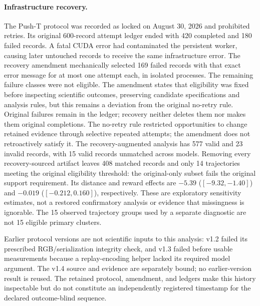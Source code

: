 \documentclass{article}
\begin{document}
\paragraph{Infrastructure recovery.}
The Push-T protocol was recorded as locked on August 30, 2026 and prohibited
retries. Its original 600-record attempt ledger ended with 420 completed and
180 failed records. A fatal CUDA error had contaminated the persistent worker,
causing later untouched records to receive the same infrastructure error.
The recovery amendment mechanically selected 169 failed records with that
exact error message for at most one attempt each, in isolated processes.
The remaining failure classes were not eligible. The amendment states that
eligibility was fixed before inspecting scientific outcomes, preserving
candidate specifications and analysis rules, but this remains a deviation
from the original no-retry rule. Original failures remain in the ledger;
recovery neither deletes them nor makes them original completions.
The no-retry rule restricted opportunities to change retained evidence through
selective repeated attempts; the amendment does not retroactively satisfy it.
The recovery-augmented analysis has
577 valid and 23 invalid records, with 15 valid records unmatched across models.
Removing every recovery-sourced artifact leaves 408 matched records and only
14 trajectories meeting the original eligibility threshold: the original-only
subset fails the original support requirement. Its distance and reward effects
are $-5.39$ ($[-9.32,-1.40]$) and $-0.019$ ($[-0.212,0.160]$), respectively.
These are exploratory sensitivity estimates, not a restored confirmatory
analysis or evidence that missingness is ignorable. The 15 observed trajectory
groups used by a separate diagnostic are not 15 eligible primary clusters.

Earlier protocol versions are not scientific inputs to this analysis: v1.2
failed its prescribed RGB/serialization integrity check, and v1.3 failed
before usable measurements because a replay-encoding helper lacked its
required model argument. The v1.4 source and evidence are separately bound;
no earlier-version result is reused. The retained protocol, amendment, and
ledgers make this history inspectable but do not constitute an independently
registered timestamp for the declared outcome-blind sequence.
\end{document}
